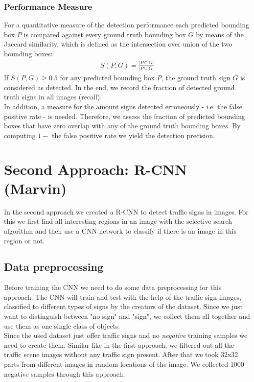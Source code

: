 \documentclass[12pt,a4paper,bibliography=totocnumbered,listof=totocnumbered]{scrartcl}
\begin{document}
\subsubsection{Performance Measure} \label{ssec:perf}
For a quantitative measure of the detection performance each predicted bounding box $P$ is compared against every ground truth bounding box $G$ by means of the Jaccard similarity, which is defined as the intersection over union of the two bounding boxes: 
\begin{align*}
	S(P,G) = \frac{|P \cap G|}{|P \cup G|}
\end{align*}
If $S(P,G) \geq 0.5$ for any predicted bounding box $P$, the ground truth sign $G$ is considered as detected. In the end, we record the fraction of detected ground truth signs in all images (recall). \\
In addition, a measure for the amount signs detected erroneously - i.e. the false positive rate - is needed.  Therefore, we assess the fraction of predicted bounding boxes that have zero overlap with any of the ground truth bounding boxes. By computing $1-$ the false positive rate we yield the detection precision. 

\pagebreak
\section{Second Approach: R-CNN \small{(Marvin)}}

In the second approach we created a R-CNN to detect traffic signs in images. For this we first find all interesting regions in an image with the selective search algorithm and then use a CNN network to classify if there is an image in this region or not.

\subsection{Data preprocessing}

Before training the CNN we need to do some data preprocessing for this approach. The CNN will train and test with the help of the traffic sign images, classified to different types of signs by the creators of the dataset. Since we just want to distinguish between "no sign" and "sign", we collect them all together and use them as one single class of objects.\\Since the used dataset just offer traffic signs and no \textit{negative} training samples we need to create them. Similar like in the first approach, we filtered out all the traffic scene images without any traffic sign present. After that we took 32x32 parts from different images in random locations of the image. We collected 1000 negative samples through this approach.\\
\end{document}
